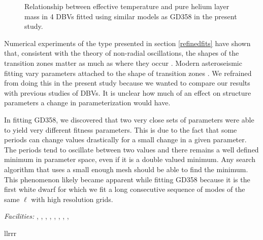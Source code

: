 \documentclass[12pt,preprint]{aastex}
\begin{document}
\begin{figure}
\caption{
Relationship between effective temperature and pure helium layer mass in 4 DBVs fitted using similar 
models as GD358 in the present study. \label{ffit5}
}
\end{figure}

Numerical experiments of the type presented in section \ref{refinedfits} have shown that, consistent with 
the theory of non-radial oscillations, the shapes of the transition zones matter as much as where 
they occur \citep{Bischoff-Kim15}. Modern asteroseismic fitting vary parameters attached to the shape of 
transition zones \citep{Giammichele15}. We refrained from doing this in the present study because we wanted to 
compare our results with previous studies of DBVs. It is unclear how much of an effect on structure parameters a 
change in parameterization would have.

In fitting GD358, we discovered that two very close sets of parameters were able to yield very different fitness 
parameters. This is due to the fact that some periods can change values drastically for a small change in a given 
parameter. The periods tend to oscillate between two values and there remains a well defined minimum in parameter space, 
even if it is a double valued minimum. Any search algorithm that uses a small enough mesh should be able to find the 
minimum. This phenomenon likely became apparent while fitting GD358 because it is the first white dwarf for which 
we fit a long consecutive sequence of modes of the same $\ell$ with high resolution grids.

\acknowledgments


{\it Facilities:} , ,
, 
\facility{}, , ,
, , 






\clearpage

\begin{deluxetable}{llrrr}
\tabletypesize{\small}
\tablewidth{0pc}
\tablecaption{\label{journal}}
\startdata

\enddata
{}
\end{deluxetable}
\end{document}
